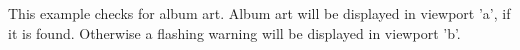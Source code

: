 \begin{example}
\end{example}
This example checks for album art. Album art will be displayed in viewport 'a', if
it is found. Otherwise a flashing warning will be displayed in viewport 'b'.
